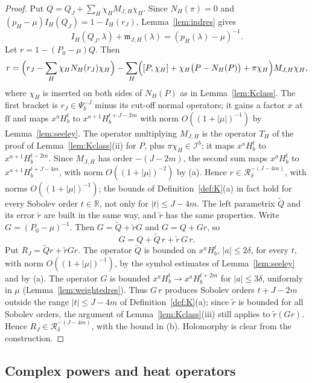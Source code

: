 \documentclass[11pt,oneside,reqno]{article}
\newcommand{\Ib}{\mathcal I^b}
\theoremstyle{plain}
\theoremstyle{definition}
\theoremstyle{remark}
\begin{document}
\begin{proof}
Put \(Q=Q_J+\sum_H\chi_HM_{J,H}\chi_H\). Since \(N_H(\pi)=0\) and
\((p_H-\mu)I_H(Q_J)=1-I_H(r_J)\), Lemma~\ref{lem:indres} gives
\[
 I_H(Q_J,\lambda)+\mathfrak m_{J,H}(\lambda)=(p_H(\lambda)-\mu)^{-1}.
\]
Let \(r=1-(P_0-\mu)Q\). Then
\[
 r=\Bigl(r_J-\sum_H\chi_HN_H(r_J)\chi_H\Bigr)
 -\sum_H\Bigl([P,\chi_H]+\chi_H\bigl(P-N_H(P)\bigr)+\pi\chi_H\Bigr)
 M_{J,H}\chi_H,
\]
where \(\chi_H\) is inserted on both sides of \(N_H(P)\) as in
Lemma~\ref{lem:Kclass}. The first bracket is \(r_J\in\Psi_b^{-J}\) minus
its cut-off normal operators; it gains a factor \(x\) at \(\mathrm{ff}\) and
maps \(x^aH^t_b\) to \(x^{a+1}H^{t+J-2m}_b\) with norm
\(O((1+|\mu|)^{-1})\) by Lemma~\ref{lem:seeley}. The operator multiplying
\(M_{J,H}\) is the operator \(T_H\) of the proof of
Lemma~\ref{lem:Kclass}(ii) for \(P\), plus \(\pi\chi_H\in\Ib\); it maps
\(x^aH^t_b\) to \(x^{a+1}H^{t-2m}_b\). Since \(M_{J,H}\) has order
\(-(J-2m)\), the second sum maps \(x^aH^t_b\) to \(x^{a+1}H^{t+J-4m}_b\),
with norm \(O((1+|\mu|)^{-2})\) by (a). Hence
\(r\in\mathcal R^{-(J-4m)}_\delta\), with norms \(O((1+|\mu|)^{-1})\); the
bounds of Definition~\ref{def:K}(a) in fact hold for every Sobolev order
\(t\in\mathbb R\), not only for \(|t|\leq J-4m\). The left
parametrix \(\tilde Q\) and its error \(\tilde r\) are built in the same
way, and \(\tilde r\) has the same properties. Write \(G=(P_0-\mu)^{-1}\).
Then \(G=\tilde Q+\tilde rG\) and \(G=Q+Gr\), so
\[
 G=Q+\tilde Q\,r+\tilde r\,G\,r .
\]
Put \(R_J=\tilde Qr+\tilde rGr\). The operator \(\tilde Q\) is bounded on
\(x^aH^t_b\), \(|a|\leq2\delta\), for every \(t\), with norm
\(O((1+|\mu|)^{-1})\), by the symbol estimates of Lemma~\ref{lem:seeley}
and by (a). The operator \(G\) is bounded \(x^aH^t_b\to x^aH^{t+2m}_b\) for
\(|a|\leq3\delta\), uniformly in \(\mu\) (Lemma~\ref{lem:weightedres}).
Thus \(G\,r\) produces Sobolev orders \(t+J-2m\) outside the range
\(|t|\leq J-4m\) of Definition~\ref{def:K}(a); since \(\tilde r\) is bounded
for all Sobolev orders, the argument of Lemma~\ref{lem:Kclass}(iii) still
applies to \(\tilde r(Gr)\). Hence \(R_J\in\mathcal R^{-(J-4m)}_\delta\),
with the bound in (b). Holomorphy is clear from the
construction.
\end{proof}

\subsection{Complex powers and heat operators}\label{subsec:cp}
\end{document}
